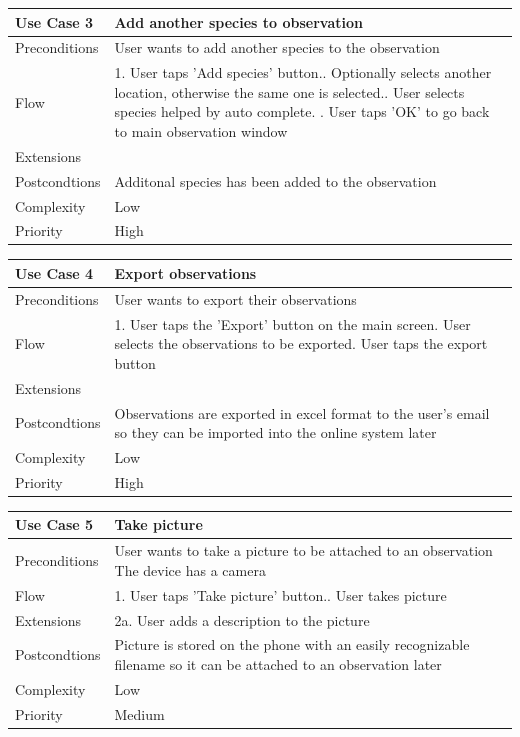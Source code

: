 \begin{tabular}[t]{|l|p{}|}\hline
	Use Case 3&Add another species to observation\\\hline
	Preconditions&User wants to add another species to the observation\\\hline
	Flow&1. User taps 'Add species' button.\newline
	2. Optionally selects another location, otherwise the same one is selected.\newline
	3. User selects species helped by auto complete. \newline
	4. User taps 'OK' to go back to main observation window \\\hline  
	Extensions& \\\hline
	Postcondtions&Additonal species has been added to the observation\\\hline
	Complexity&Low\\\hline
	Priority&High\\\hline
\end{tabular}

\hspace{2em}

\begin{tabular}[t]{|l|p{}|}\hline
	Use Case 4&Export  observations\\\hline
	Preconditions& User wants to export their observations \\\hline
	Flow&1. User taps the 'Export' button on the main screen\newline
	2. User selects the observations to be exported\newline
	3. User taps the export button\\\hline
	Extensions& \\\hline
	Postcondtions&Observations are exported in excel format to the user's email so they can be imported into the online system later\\\hline
	Complexity&Low\\\hline
	Priority&High\\\hline
\end{tabular}

\hspace{2em}

\begin{tabular}[t]{|l|p{}|}\hline
	Use Case 5&Take picture\\\hline
	Preconditions&User wants to take a picture to be attached to an observation\newline
	The device has a camera\\\hline
	Flow&1. User taps 'Take picture' button.\newline
	2. User takes picture \\\hline
	Extensions& 2a. User adds a description to the picture\\\hline
	Postcondtions&Picture is stored on the phone with an easily recognizable filename so it can be attached to an observation 	later\\\hline
	Complexity&Low\\\hline
	Priority&Medium\\\hline
\end{tabular}
	
